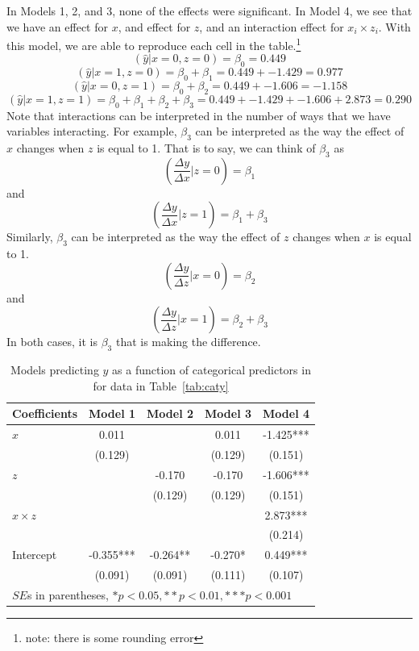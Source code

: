 In Models 1, 2, and 3, none of the effects were significant. In Model 4, we see that we have an effect for $x$, and effect for $z$, and an interaction effect for $x_i\times z_i$. With this model, we are able to reproduce each cell in the table.\footnote{note: there is some rounding error}
\[
\left(\hat{y}|x=0,z=0\right)=\beta_0=0.449
\]
\[
\left(\hat{y}|x=1,z=0\right)=\beta_0+\beta_1=0.449+-1.429=0.977
\]
\[
\left(\hat{y}|x=0,z=1\right)=\beta_0+\beta_2=0.449+-1.606=-1.158
\]
\[
\left(\hat{y}|x=1,z=1\right)=\beta_0+\beta_1+\beta_2+\beta_3=0.449+-1.429+-1.606+2.873=0.290
\]
Note that interactions can be interpreted in the number of ways that we have variables interacting. For example, $\beta_3$ can be interpreted as the way the effect of $x$ changes when $z$ is equal to 1. That is to say, we can think of $\beta_3$ as
\[
\left(\frac{\Delta y}{\Delta x}\vert z=0\right)=\beta_1
\]
and
\[
\left(\frac{\Delta y}{\Delta x}\vert z=1\right)=\beta_1+\beta_3
\]
Similarly, $\beta_3$ can be interpreted as the way the effect of $z$ changes when $x$ is equal to 1.
\[
\left(\frac{\Delta y}{\Delta z}\vert x=0\right)=\beta_2
\]
and
\[
\left(\frac{\Delta y}{\Delta z}\vert x=1\right)=\beta_2+\beta_3
\]
In both cases, it is $\beta_3$ that is making the difference.
\begin{table}[htbp]\centering
\caption{Models predicting $y$ as a function of categorical predictors in for data in Table~\ref{tab:caty}
\label{tab:catyreg}}
\begin{tabular}{lcccc}
\hline
Coefficients&   Model 1  &   Model 2  &     Model 3  &    Model 4  \\
\hline
$x$     &    0.011  &        &    0.011  &   -1.425***\\
      &   (0.129)  &        &   (0.129)  &   (0.151)  \\
$z$     &        &   -0.170  &   -0.170  &   -1.606***\\
      &        &   (0.129)  &   (0.129)  &   (0.151)  \\
$x\times z$   &        &        &        &    2.873***\\
      &        &        &        &   (0.214)  \\
Intercept    &   -0.355***&   -0.264** &   -0.270* &    0.449***\\
      &   (0.091)  &   (0.091)  &   (0.111)  &   (0.107)  \\
\hline
\multicolumn{5}{l}{$SE$s in parentheses, $* p < 0.05, ** p < 0.01, ***p<0.001$} \\
\hline
\end{tabular}
\end{table}
